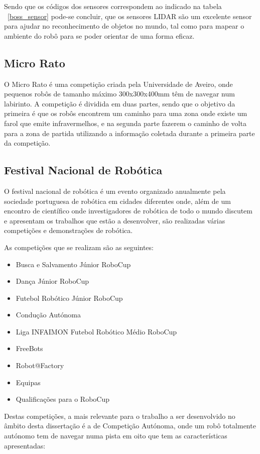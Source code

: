 Sendo que os códigos dos sensores correspondem ao indicado na tabela ~\ref{boss_sensor} pode-se concluir, que os sensores LIDAR são um excelente sensor para ajudar no reconhecimento de objetos no mundo, tal como para mapear o ambiente do robô para se poder orientar de uma forma eficaz.


\subsection{Micro Rato}

O  Micro Rato é uma competição criada pela Universidade de Aveiro, onde pequenos robôs de tamanho máximo 300x300x400mm têm de navegar num labirinto. A competição é dividida em duas partes, sendo que o objetivo da primeira é que os robôs encontrem um caminho para uma zona onde existe um farol que emite infravermelhos, e na segunda parte fazerem o caminho de volta para a zona de partida utilizando a informação coletada durante a primeira parte da competição.


\subsection{Festival Nacional de Robótica}

O festival nacional de robótica é um evento organizado anualmente pela sociedade
portuguesa de robótica em cidades diferentes onde, além de um encontro de científico
onde investigadores de robótica de todo o mundo discutem e apresentam os trabalhos
que estão a desenvolver, são realizadas várias competições e demonstrações de robótica.

As competições que se realizam são as seguintes:
\begin{itemize}
\item    Busca e Salvamento Júnior RoboCup
\item    Dança Júnior RoboCup
\item    Futebol Robótico Júnior RoboCup
\item    Condução Autónoma
\item    Liga INFAIMON Futebol Robótico Médio RoboCup
\item    FreeBots
\item    Robot@Factory
\item    Equipas
\item    Qualificações para o RoboCup
\end{itemize}

Destas competições, a mais relevante para o trabalho a ser desenvolvido no 
âmbito desta dissertação é a de Competição Autónoma, onde um robô totalmente 
autónomo tem de navegar numa pista em oito que tem as características apresentadas:

